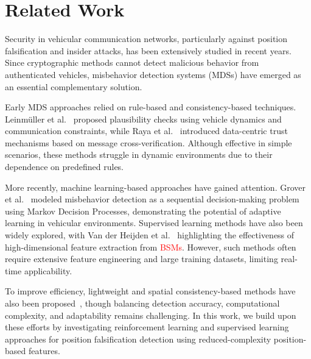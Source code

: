 \documentclass[conference]{IEEEtran}
\begin{document}
\section{Related Work}


Security in vehicular communication networks, particularly against position falsification and insider attacks, has been extensively studied in recent years. Since cryptographic methods cannot detect malicious behavior from authenticated vehicles, misbehavior detection systems (MDSs) have emerged as an essential complementary solution.

Early MDS approaches relied on rule-based and consistency-based techniques. Leinm\"uller et al.~\cite{leinmuller2006misbehavior} proposed plausibility checks using vehicle dynamics and communication constraints, while Raya et al.~\cite{raya2007data} introduced data-centric trust mechanisms based on message cross-verification. Although effective in simple scenarios, these methods struggle in dynamic environments due to their dependence on predefined rules.

More recently, machine learning-based approaches have gained attention. Grover et al.~\cite{grover2018mdp} modeled misbehavior detection as a sequential decision-making problem using Markov Decision Processes, demonstrating the potential of adaptive learning in vehicular environments. Supervised learning methods have also been widely explored, with Van der Heijden et al.~\cite{heijden2018survey} highlighting the effectiveness of high-dimensional feature extraction from \textcolor{red}{BSMs}. However, such methods often require extensive feature engineering and large training datasets, limiting real-time applicability.

To improve efficiency, lightweight and spatial consistency-based methods have also been proposed~\cite{bissmeyer2011trustworthy,sedjelmaci2018intrusion}, though balancing detection accuracy, computational complexity, and adaptability remains challenging. In this work, we build upon these efforts by investigating reinforcement learning and supervised learning approaches for position falsification detection using reduced-complexity position-based features.
\end{document}
